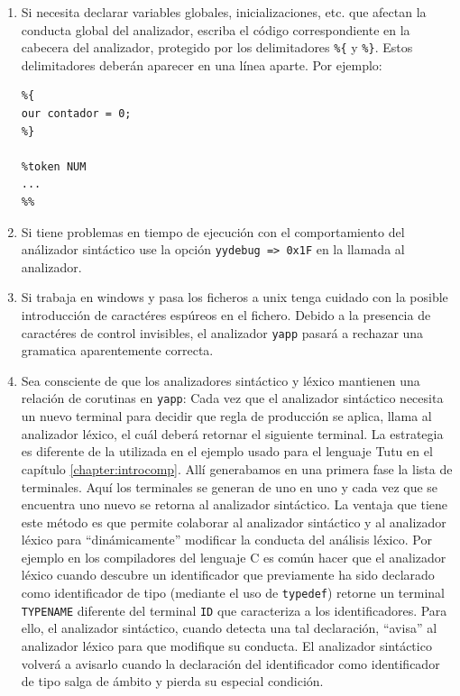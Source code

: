 \begin{enumerate}
\item
Si necesita declarar variables globales, inicializaciones, etc.
que afectan la conducta global del analizador, escriba el código 
correspondiente en la cabecera del analizador, protegido
por los delimitadores \verb|%{| y \verb|%}|. Estos delimitadores
deberán aparecer en una línea aparte. Por ejemplo:

\begin{verbatim}
%{
our contador = 0;
%}

%token NUM
...
%%
\end{verbatim}

\item
Si tiene problemas en tiempo de ejecución con el comportamiento del análizador
sintáctico use la opción \verb|yydebug => 0x1F| en la llamada al analizador.

\item
Si trabaja en windows y pasa los ficheros a unix tenga cuidado con la posible
introducción de caractéres espúreos en el fichero. Debido
a la presencia de caractéres de control invisibles, el analizador \verb|yapp| 
pasará a rechazar una gramatica aparentemente correcta.

\item
Sea consciente de que los analizadores sintáctico y  léxico mantienen
una relación de corutinas en \verb|yapp|: Cada vez que 
el analizador sintáctico necesita un nuevo terminal para decidir que regla de
producción se aplica, llama al analizador léxico, el cuál deberá retornar el siguiente
terminal. La estrategia es diferente de la utilizada en el ejemplo
usado para el lenguaje Tutu en el capítulo 
\ref{chapter:introcomp}. Allí generabamos en una primera fase
la lista de terminales. Aquí los terminales se generan  de uno en uno
y cada vez que se encuentra uno nuevo se retorna al analizador sintáctico.
La ventaja que tiene este método es que permite colaborar al analizador sintáctico
y al analizador léxico para ``dinámicamente'' modificar la conducta 
del análisis léxico. Por ejemplo en los compiladores del lenguaje C
es común hacer que el analizador léxico cuando descubre un identificador que 
previamente ha sido declarado como identificador de tipo (mediante 
el uso de \verb|typedef|) retorne un terminal \verb|TYPENAME| 
diferente del terminal \verb|ID|
que caracteriza a los identificadores. Para ello, el analizador
sintáctico, cuando detecta una tal declaración, ``avisa'' al analizador 
léxico para que modifique su conducta. El analizador sintáctico volverá
a avisarlo cuando la declaración del identificador como
identificador de tipo salga de ámbito y pierda
su especial condición.  


\end{enumerate}
